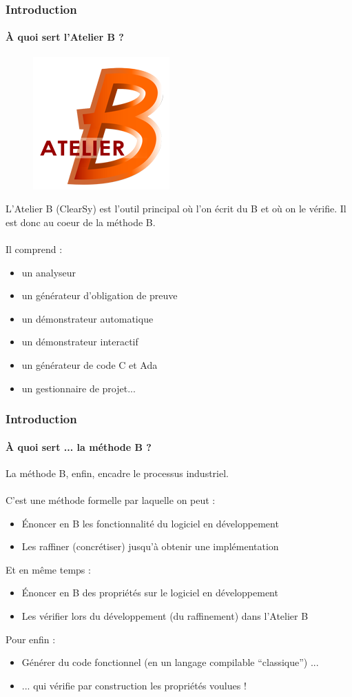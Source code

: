 \documentclass[11pt,a4paper,xcolor=table, handout]{beamer} %
\begin{document}
\begin{frame}
\frametitle{Introduction}
\framesubtitle{À quoi sert l'Atelier B ?}
\begin{figure}[h]
\centering
\includegraphics[scale=0.2]{ressources/logo.png}
\end{figure}
\pause
L'Atelier B (ClearSy) est l'outil principal où l'on écrit du B et où on le vérifie. Il est donc au coeur de la méthode B.\\~\\
\pause
Il comprend :
\begin{itemize}
\item un analyseur
\pause
\item un générateur d'obligation de preuve
\pause
\item un démonstrateur automatique
\pause
\item un démonstrateur interactif
\pause
\item un générateur de code C et Ada
\pause
\item un gestionnaire de projet...
\end{itemize}
\end{frame}

\begin{frame}
\frametitle{Introduction}
\framesubtitle{À quoi sert ... la méthode B ?}
La méthode B, enfin, encadre le processus industriel.\\~\\ \pause
C'est une méthode formelle par laquelle on peut :\pause
\begin{itemize}
\item Énoncer en B les fonctionnalité du logiciel en développement
\pause
\item Les raffiner (concrétiser) jusqu'à obtenir une implémentation
\pause
\end{itemize}
Et en même temps :\pause
\begin{itemize}
\item Énoncer en B des propriétés sur le logiciel en développement
\pause
\item Les vérifier lors du développement (du raffinement) dans l'Atelier B
\pause
\end{itemize}
Pour enfin :
\begin{itemize}
\item Générer du code fonctionnel (en un langage compilable ``classique'') ...
\pause
\item ... qui vérifie par construction les propriétés voulues !
\end{itemize}
\end{frame}
\end{document}
